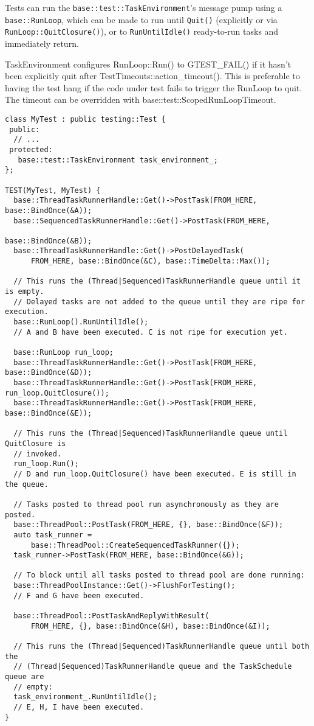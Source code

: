 \documentclass[a4paper,12pt,notitlepage,twoside,openright]{article}
\begin{document}
Tests can run the \texttt{base::test::TaskEnvironment}'s message pump
using a \texttt{base::RunLoop}, which can be made to run until
\texttt{Quit()} (explicitly or via \texttt{RunLoop::QuitClosure()}), or
to \texttt{RunUntilIdle()} ready-to-run tasks and immediately return.

TaskEnvironment configures RunLoop::Run() to GTEST\_FAIL() if it hasn't
been explicitly quit after TestTimeouts::action\_timeout(). This is
preferable to having the test hang if the code under test fails to
trigger the RunLoop to quit. The timeout can be overridden with
base::test::ScopedRunLoopTimeout.

\begin{verbatim}
class MyTest : public testing::Test {
 public:
  // ...
 protected:
   base::test::TaskEnvironment task_environment_;
};

TEST(MyTest, MyTest) {
  base::ThreadTaskRunnerHandle::Get()->PostTask(FROM_HERE, base::BindOnce(&A));
  base::SequencedTaskRunnerHandle::Get()->PostTask(FROM_HERE,
                                                   base::BindOnce(&B));
  base::ThreadTaskRunnerHandle::Get()->PostDelayedTask(
      FROM_HERE, base::BindOnce(&C), base::TimeDelta::Max());

  // This runs the (Thread|Sequenced)TaskRunnerHandle queue until it is empty.
  // Delayed tasks are not added to the queue until they are ripe for execution.
  base::RunLoop().RunUntilIdle();
  // A and B have been executed. C is not ripe for execution yet.

  base::RunLoop run_loop;
  base::ThreadTaskRunnerHandle::Get()->PostTask(FROM_HERE, base::BindOnce(&D));
  base::ThreadTaskRunnerHandle::Get()->PostTask(FROM_HERE, run_loop.QuitClosure());
  base::ThreadTaskRunnerHandle::Get()->PostTask(FROM_HERE, base::BindOnce(&E));

  // This runs the (Thread|Sequenced)TaskRunnerHandle queue until QuitClosure is
  // invoked.
  run_loop.Run();
  // D and run_loop.QuitClosure() have been executed. E is still in the queue.

  // Tasks posted to thread pool run asynchronously as they are posted.
  base::ThreadPool::PostTask(FROM_HERE, {}, base::BindOnce(&F));
  auto task_runner =
      base::ThreadPool::CreateSequencedTaskRunner({});
  task_runner->PostTask(FROM_HERE, base::BindOnce(&G));

  // To block until all tasks posted to thread pool are done running:
  base::ThreadPoolInstance::Get()->FlushForTesting();
  // F and G have been executed.

  base::ThreadPool::PostTaskAndReplyWithResult(
      FROM_HERE, {}, base::BindOnce(&H), base::BindOnce(&I));

  // This runs the (Thread|Sequenced)TaskRunnerHandle queue until both the
  // (Thread|Sequenced)TaskRunnerHandle queue and the TaskSchedule queue are
  // empty:
  task_environment_.RunUntilIdle();
  // E, H, I have been executed.
}
\end{verbatim}
\end{document}

